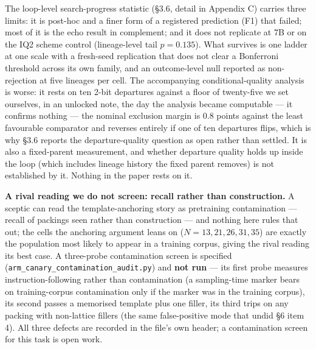 The loop-level search-progress statistic (\S3.6, detail in Appendix C) carries three limits: it is post-hoc and a finer form of a registered prediction (F1) that failed; most of it is the echo result in complement; and it does not replicate at 7B or on the IQ2 scheme control (lineage-level tail $p = 0.135$). What survives is one ladder at one scale with a fresh-seed replication that does not clear a Bonferroni threshold across its own family, and an outcome-level null reported as non-rejection at five lineages per cell. The accompanying conditional-quality analysis is worse: it rests on ten 2-bit departures against a floor of twenty-five we set ourselves, in an unlocked note, the day the analysis became computable --- it confirms nothing --- the nominal exclusion margin is 0.8 points against the least favourable comparator and reverses entirely if one of ten departures flips, which is why \S3.6 reports the departure-quality question as open rather than settled. It is also a fixed-parent measurement, and whether departure quality holds up inside the loop (which includes lineage history the fixed parent removes) is not established by it. Nothing in the paper rests on it.

\textbf{A rival reading we do not screen: recall rather than construction.} A sceptic can read the template-anchoring story as pretraining contamination --- recall of packings seen rather than construction --- and nothing here rules that out; the cells the anchoring argument leans on ($N = 13, 21, 26, 31, 35$) are exactly the population most likely to appear in a training corpus, giving the rival reading its best case. A three-probe contamination screen is specified (\texttt{arm\_canary\_contamination\_audit.py}) and \textbf{not run} --- its first probe measures instruction-following rather than contamination (a sampling-time marker bears on training-corpus contamination only if the marker was in the training corpus), its second passes a memorised template plus one filler, its third trips on any packing with non-lattice fillers (the same false-positive mode that undid \S6 item 4). All three defects are recorded in the file's own header; a contamination screen for this task is open work.

